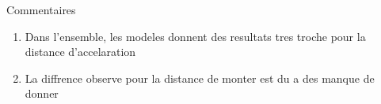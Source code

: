 

\begin{frame}{Commentaires }
	
	\begin{block}{}
		
		\begin{enumerate}[]
			
			\item Dans l'ensemble, les modeles donnent des resultats tres troche pour la distance d'accelaration
			\item La diffrence observe pour la distance de monter est du a des manque de donner 
		
		\end{enumerate}
		
	\end{block}
	
\end{frame}